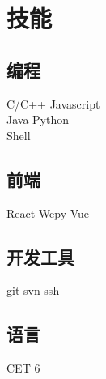 \documentclass[]{deedy-resume-openfont}
\begin{document}
\begin{minipage}[t]{0.3\textwidth}

\section{技能}
\sectionsep
\subsection{\textbf{编程}}
C/C++ \textbullet{} Javascript\\
 Java \textbullet{} Python \ \\
 Shell  \\ 
\sectionsep

\subsection{\textbf{前端}}
React \textbullet{} Wepy  \textbullet{} Vue \\



\subsection{开发工具}
git \textbullet svn \textbullet ssh \\

\subsection{\textbf{语言}}
CET 6   \\
\sectionsep

%
%

\end{minipage} 
\hfill
\end{document}
